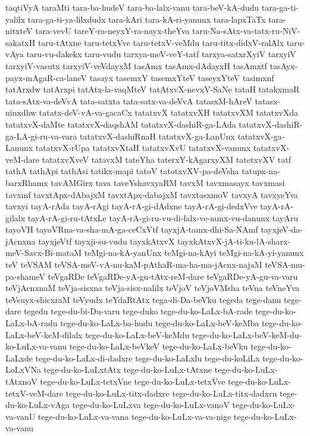 {taqtiVyA
taraMti
tara-ba-hudeV
tara-ba-lalx-vanu
tara-beV-kA-dudu
tara-ga-ti-yalilx
tara-ga-ti-ya-lilxdudx
tara-kAri
tara-kA-ri-yanunx
tara-lapxTaTx
tara-nitxteV
tara-vevU
tareY-ra-neyxY-ra-nayx-theYva
taru-Na-sAtx-va-tatx-ru-NiV-sakatxH
taru-tAtxne
taru-tetxVve
taru-tetxV-veMdu
taru-titx-didxV-ralAlx
taru-vAya
taru-vu-dakekx
taru-vudu
tarxya-meV-veY-tatf
tarxya-satxrXyiV
tarxyiV
tarxyiV-vasutx
tarxyiV-veVdayxM
tasAmx
tasAmx-dAdayxH
tasAmxtf
tasAyx-payx-mAgaR-ca-laneV
tasayx
tasemxY
tasemxYteV
taseyxYteV
tasimxnf
tatArxdw
tatArxpi
tatAtx-la-vaqMteV
tatAtxvX-nevxV-SaNe
tataH
tatakxmaR
tata-sAtx-va-deVvA
tata-satxta
tata-satx-va-deVvA
tatasxM-hAreV
tatasx-ninxdhw
tatatx-deV-vA-va-gacaCx
tatatxvX
tatatxvXH
tatatxvXM
tatatxvXda
tatatxvX-daMte
tatatxvX-daqshAM
tatatxvX-dashiR-ga-LAda
tatatxvX-dashiR-ga-LA-gi-ru-va-vara
tatatxvX-dashiRnaH
tatatxvX-ga-LanUnx
tatatxvX-ga-Lanunx
tatatxvX-rUpa
tatatxvXtaH
tatatxvXvU
tatatxvX-vanunx
tatatxvX-veM-dare
tatatxvXveV
tatavxM
tateYha
taterxY-kAgarxyXM
tatetxvXV
tatf
tathA
tathApi
tathAsi
tatikx-mapi
tatoV
tatotxvXV-pa-deVsha
tatupx-na-barxRhamx
tavAMGirx
tava
taveYshavxyaRM
tavxM
tavxmasayx
tavxmasi
tavxmf
tavxtApx-dAbajxM
tavxtApx-dabajxM
tavxtasxmoV
tavxyA
tavxyeYva
tavxyi
tayA-rAda
tayA-rAgi
tayA-rA-gi-dAdxne
tayA-rA-gi-dedxVve
tayA-rA-gilalx
tayA-rA-gi-ru-tAtxLe
tayA-rA-gi-ru-vu-di-lalx-ve-nunx-vu-danunx
tayAru
tayoVH
tayoVRna-va-sha-mA-ga-ceCxVtf
tayxjA-tamx-dhi-Sa-NAmf
tayxjeV-da-jAcnxna
tayxjeVtf
tayxji-su-vudu
tayxkAtxvX
tayxkAtxvX-jA-ti-ku-lA-sharx-meV-Savx-Bi-mataM
teMgi-na-kA-yanUnx
teMgi-na-kAyi
teMgi-na-kA-yi-yanunx
teV
teVSAM
teVSA-meV-vA-nu-kaM-pAthaR-ma-ha-ma-jAcnx-najaM
teVSA-mu-pa-shameV
teVgaRDe
teVgaRDe-yA-gu-tAtx-reM-dare
teVgaRDe-yA-gu-va-varu
teVjAcnxnaM
teVja-sisxna
teVja-sisx-nalilx
teVjoV
teVjoVMsha
teVna
teVneYva
teVsuyx-shicxraM
teVyudx
teYdaRtAtx
tega-di-Da-beVku
tegeda
tege-danu
tege-dare
tegedu
tege-du-bi-Du-varu
tege-duko
tege-du-ko-LaLx-bA-rade
tege-du-ko-LaLx-bA-radu
tege-du-ko-LaLx-ba-hudu
tege-du-ko-LaLx-beV-keMba
tege-du-ko-LaLx-beV-keM-dilalx
tege-du-ko-LaLx-beV-keMdu
tege-du-ko-LaLx-beV-keM-du-ko-LuLx-va-vanu
tege-du-ko-LaLx-beVkeV
tege-du-ko-LaLx-beVku
tege-du-ko-LaLxde
tege-du-ko-LaLx-di-dadxre
tege-du-ko-LaLxlu
tege-du-koLiLx
tege-du-ko-LoLxVNa
tege-du-ko-LuLxtAtx
tege-du-ko-LuLx-tAtxne
tege-du-ko-LuLx-tAtxnoV
tege-du-ko-LuLx-tetxVne
tege-du-ko-LuLx-tetxVve
tege-du-ko-LuLx-tetxV-veM-dare
tege-du-ko-LuLx-titx-dadxre
tege-du-ko-LuLx-titx-dadxru
tege-du-ko-LuLx-vAga
tege-du-ko-LuLxva
tege-du-ko-LuLx-vanoV
tege-du-ko-LuLx-va-vanU
tege-du-ko-LuLx-va-vana
tege-du-ko-LuLx-va-va-nige
tege-du-ko-LuLx-va-vanu
}
